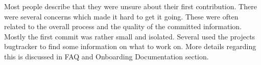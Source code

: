 Most people describe that they were unsure about their first contribution. There were several concerns which made it hard to get it going. These were often related to the overall process and the quality of the committed information. Mostly the first commit was rather small and isolated. Several used the projects bugtracker to find some information on what to work on. More details regarding this is discussed in FAQ and Onboarding Documentation section.
